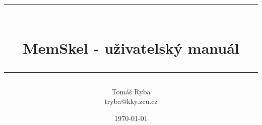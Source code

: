 \documentclass[a4paper,oneside,12pt]{report}
\newcommand{\HRule}{\rule{\linewidth}{0.5mm}}
\begin{document}
\title{\HRule\\
		\vskip 0.5cm
		\textbf{MemSkel - uživatelský manuál}\\
		\HRule}
\author{Tomáš Ryba\\ tryba@kky.zcu.cz}
\date{\vfill \today}
\maketitle


\end{document}
